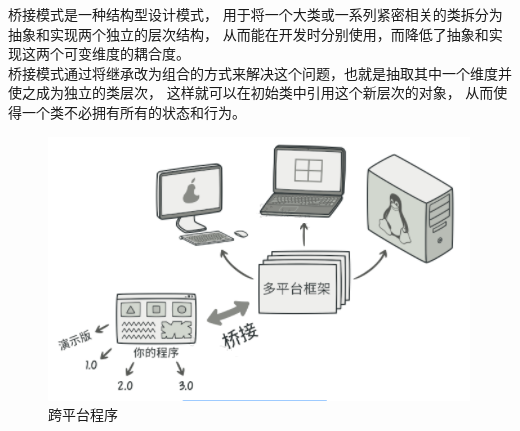 桥接模式是一种结构型设计模式， 用于将一个大类或一系列紧密相关的类拆分为抽象和实现两个独立的层次结构， 从而能在开发时分别使用，而降低了抽象和实现这两个可变维度的耦合度。\\

桥接模式通过将继承改为组合的方式来解决这个问题，也就是抽取其中一个维度并使之成为独立的类层次， 这样就可以在初始类中引用这个新层次的对象， 从而使得一个类不必拥有所有的状态和行为。

\begin{figure}[H]
    \centering
    \includegraphics{img/C4/4-8/1.png}
    \caption{跨平台程序}
\end{figure}

\vspace{0.5cm}

\\

